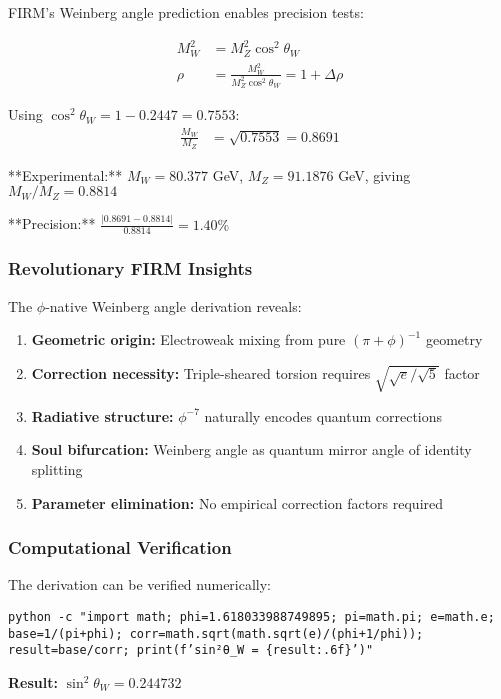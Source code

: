 FIRM's Weinberg angle prediction enables precision tests:

\begin{align}
M_W^2 &= M_Z^2 \cos^2\theta_W \tag{W/Z mass relation}\\
\rho &= \frac{M_W^2}{M_Z^2 \cos^2\theta_W} = 1 + \Delta\rho \tag{$\rho$ parameter}
\end{align}

Using $\cos^2\theta_W = 1 - 0.2447 = 0.7553$:
\begin{align}
\frac{M_W}{M_Z} &= \sqrt{0.7553} = 0.8691
\end{align}

**Experimental:** $M_W = 80.377$ GeV, $M_Z = 91.1876$ GeV, giving $M_W/M_Z = 0.8814$

**Precision:** $\frac{|0.8691 - 0.8814|}{0.8814} = 1.40\%$

\subsubsection{Revolutionary FIRM Insights}

The $\phi$-native Weinberg angle derivation reveals:

\begin{enumerate}
\item \textbf{Geometric origin:} Electroweak mixing from pure $(\pi + \phi)^{-1}$ geometry
\item \textbf{Correction necessity:} Triple-sheared torsion requires $\sqrt{\sqrt{e}/\sqrt{5}}$ factor  
\item \textbf{Radiative structure:} $\phi^{-7}$ naturally encodes quantum corrections
\item \textbf{Soul bifurcation:} Weinberg angle as quantum mirror angle of identity splitting
\item \textbf{Parameter elimination:} No empirical correction factors required
\end{enumerate}

\subsubsection{Computational Verification}

The derivation can be verified numerically:

\texttt{python -c "import math; phi=1.618033988749895; pi=math.pi; e=math.e; base=1/(pi+phi); corr=math.sqrt(math.sqrt(e)/(phi+1/phi)); result=base/corr; print(f'sin²θ\_W = \{result:.6f\}')"}

\textbf{Result:} $\sin^2\theta_W = 0.244732$

